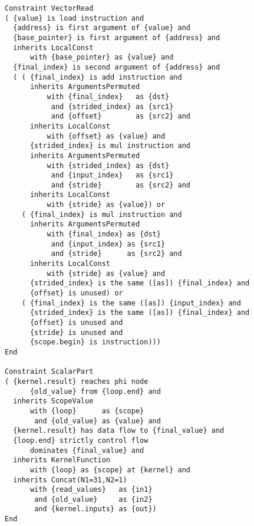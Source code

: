 \begin{figure}[p]
\begin{lstlisting}[language=IDL, firstnumber=31]
Constraint VectorRead
( {value} is load instruction and
  {address} is first argument of {value} and
  {base_pointer} is first argument of {address} and
  inherits LocalConst
      with {base_pointer} as {value} and
  {final_index} is second argument of {address} and
  ( ( {final_index} is add instruction and
      inherits ArgumentsPermuted
          with {final_index}   as {dst}
           and {strided_index} as {src1}
           and {offset}        as {src2} and
      inherits LocalConst
          with {offset} as {value} and
      {strided_index} is mul instruction and
      inherits ArgumentsPermuted
          with {strided_index} as {dst}
           and {input_index}   as {src1}
           and {stride}        as {src2} and
      inherits LocalConst
          with {stride} as {value}) or 
    ( {final_index} is mul instruction and
      inherits ArgumentsPermuted
          with {final_index} as {dst}
           and {input_index} as {src1}
           and {stride}      as {src2} and
      inherits LocalConst
          with {stride} as {value} and
      {strided_index} is the same ([as]) {final_index} and
      {offset} is unused) or 
    ( {final_index} is the same ([as]) {input_index} and
      {strided_index} is the same ([as]) {final_index} and
      {offset} is unused and
      {stride} is unused and
      {scope.begin} is instruction)))
End

Constraint ScalarPart
( {kernel.result} reaches phi node
      {old_value} from {loop.end} and
  inherits ScopeValue
      with {loop}      as {scope}
       and {old_value} as {value} and 
  {kernel.result} has data flow to {final_value} and
  {loop.end} strictly control flow
      dominates {final_value} and
  inherits KernelFunction
      with {loop} as {scope} at {kernel} and
  inherits Concat(N1=31,N2=1)
      with {read_values}   as {in1}
       and {old_value}     as {in2}
       and {kernel.inputs} as {out})
End
\end{lstlisting}
\end{figure}
